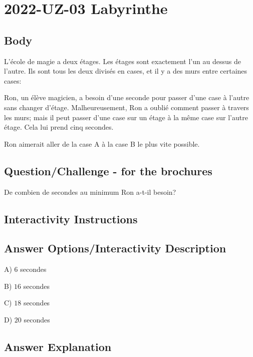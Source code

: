 \documentclass[a4paper,11pt]{report}
\newcommand{\taskGraphicsFolder}{..}
\begin{document}
\section*{\centering{} 2022-UZ-03 Labyrinthe}


\subsection*{Body}

L’école de magie a deux étages. Les étages sont exactement l’un au dessus de l’autre. Ils sont tous les deux divisés en cases, et il y a des murs entre certaines cases:

{\centering%
\par}

Ron, un élève magicien, a besoin d’une seconde pour passer d’une case à l’autre sans changer d’étage. Malheureusement, Ron a oublié comment passer à travers les murs; mais il peut passer d’une case sur un étage à la même case sur l’autre étage. Cela lui prend cinq secondes.

Ron aimerait aller de la case A à la case B le plus vite possible.

{\em


\subsection*{Question/Challenge - for the brochures}

De combien de secondes au minimum Ron a-t-il besoin?

}


\subsection*{Interactivity Instructions}



\begingroup
\renewcommand{\arraystretch}{1.5}
\subsection*{Answer Options/Interactivity Description}

A) $6$ secondes

B) $16$ secondes

C) $18$ secondes

D) $20$ secondes

\endgroup

\subsection*{Answer Explanation}
\end{document}
